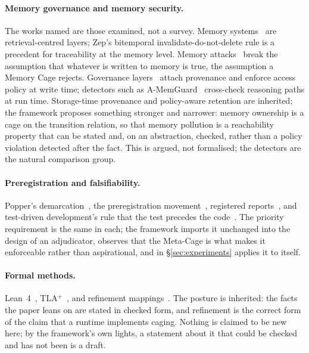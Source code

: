 \paragraph{Memory governance and memory security.}
The works named are those examined, not a survey. Memory systems~\citep{memgpt,mem0,zep,amem,memos,evermemos} are retrieval-centred layers; Zep's bitemporal invalidate-do-not-delete rule is a precedent for traceability at the memory level. Memory attacks~\citep{agentpoison,minja} break the assumption that whatever is written to memory is true, the assumption a Memory Cage rejects. Governance layers~\citep{memlineage,collabmem,mapleguard} attach provenance and enforce access policy at write time; detectors such as A-MemGuard~\citep{amemguard} cross-check reasoning paths at run time. Storage-time provenance and policy-aware retention are inherited; the framework proposes something stronger and narrower: memory ownership is a cage on the transition relation, so that memory pollution is a reachability property that can be stated and, on an abstraction, checked, rather than a policy violation detected after the fact. This is argued, not formalised; the detectors are the natural comparison group.

\paragraph{Preregistration and falsifiability.}
Popper's demarcation~\citep{popper1959}, the preregistration movement~\citep{nosek2018}, registered reports~\citep{chambers2013}, and test-driven development's rule that the test precedes the code~\citep{beck2003}. The priority requirement is the same in each; the framework imports it unchanged into the design of an adjudicator, observes that the Meta-Cage is what makes it enforceable rather than aspirational, and in \S\ref{sec:experiments} applies it to itself.

\paragraph{Formal methods.}
Lean~4~\citep{lean4}, TLA$^{+}$~\citep{lamport2002}, and refinement mappings~\citep{abadi1991}. The posture is inherited: the facts the paper leans on are stated in checked form, and refinement is the correct form of the claim that a runtime implements caging. Nothing is claimed to be new here; by the framework's own lights, a statement about it that could be checked and has not been is a draft.
